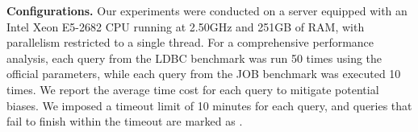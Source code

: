 
\noindent\textbf{Configurations. }
Our experiments were conducted on a server equipped with an Intel Xeon E5-2682 CPU running at 2.50GHz and 251GB of RAM, with parallelism restricted to a single thread.
For a comprehensive performance analysis, each query from the LDBC benchmark was run 50 times using the official parameters, while each query from the JOB benchmark was executed 10 times. We report the average time cost for each query to mitigate potential biases.
We imposed a timeout limit of 10 minutes for each query, and queries that fail to finish within the timeout are marked as \ot.

